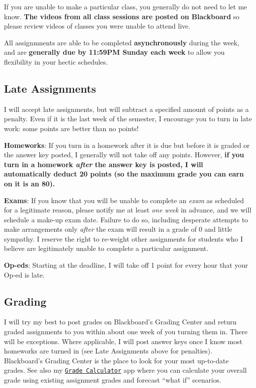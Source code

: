 \documentclass{article}
\begin{document}
If you are unable to make a particular class, you generally do not need
to let me know. \textbf{The videos from all class sessions are posted on
Blackboard} so please review videos of classes you were unable to attend
live.

All assignmnents are able to be completed \textbf{asynchronously} during
the week, and are \textbf{generally due by 11:59PM Sunday each week} to
allow you flexibility in your hectic schedules.

\hypertarget{late-assignments}{%
\subsection*{Late Assignments}\label{late-assignments}}

I will accept late assignments, but will subtract a specified amount of
points as a penalty. Even if it is the last week of the semester, I
encourage you to turn in late work: some points are better than no
points!

\textbf{Homeworks}: If you turn in a homework after it is due but before
it is graded or the answer key posted, I generally will not take off any
points. However, \textbf{if you turn in a homework \emph{after} the
answer key is posted, I will automatically deduct 20 points (so the
maximum grade you can earn on it is an 80).}

\textbf{Exams}: If you know that you will be unable to complete an
\emph{exam} as scheduled for a legitimate reason, please notify me at
least \emph{one week} in advance, and we will schedule a make-up exam
date. Failure to do so, including desperate attempts to make
arrangements only \emph{after} the exam will result in a grade of 0 and
little sympathy. I reserve the right to re-weight other assignments for
students who I believe are legitimately unable to complete a particular
assignment.

\textbf{Op-eds}: Starting at the deadline, I will take off 1 point for
every hour that your Op-ed is late.

\hypertarget{grading}{%
\subsection*{Grading}\label{grading}}

I will try my best to post grades on Blackboard's Grading Center and
return graded assignments to you within about one week of you turning
them in. There will be exceptions. Where applicable, I will post answer
keys once I know most homeworks are turned in (see Late Assignments
above for penalties). Blackboard's Grading Center is the place to look
for your most up-to-date grades. See also my
\href{https://ryansafner.shinyapps.io/306_grade_calculator/}{
\texttt{Grade\ Calculator}} app where you can calculate your overall
grade using existing assignment grades and forecast ``what if''
scenarios.
\end{document}
